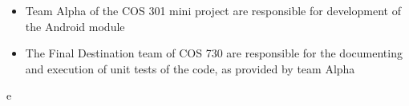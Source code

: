\begin{itemize}
	\item Team Alpha of the COS 301 mini project are responsible for development of the Android module
	\item The Final Destination team of COS 730 are responsible for the documenting and execution of unit tests of the code, as provided by team Alpha
\end{itemize}e